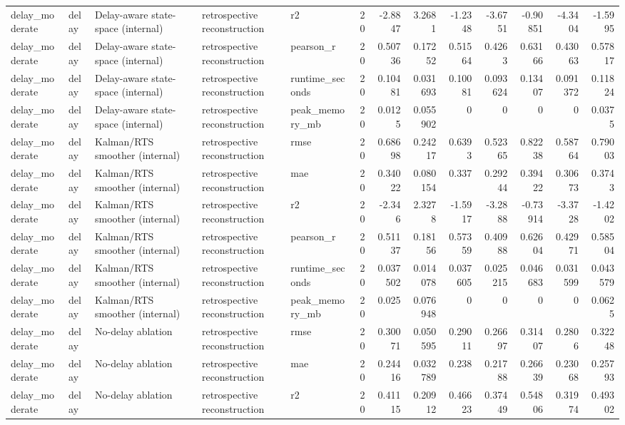 \begin{table}[!htbp]
{{\begin{tabular}{lllllrrrrrrrr}
delay_moderate & delay & Delay-aware state-space (internal) & retrospective reconstruction & r2 & 20 & -2.8847 & 3.2681 & -1.2348 & -3.6751 & -0.90851 & -4.3404 & -1.5995 \\
delay_moderate & delay & Delay-aware state-space (internal) & retrospective reconstruction & pearson_r & 20 & 0.50736 & 0.17252 & 0.51564 & 0.4263 & 0.63166 & 0.43063 & 0.57817 \\
delay_moderate & delay & Delay-aware state-space (internal) & retrospective reconstruction & runtime_seconds & 20 & 0.10481 & 0.031693 & 0.10081 & 0.093624 & 0.13407 & 0.091372 & 0.11824 \\
delay_moderate & delay & Delay-aware state-space (internal) & retrospective reconstruction & peak_memory_mb & 20 & 0.0125 & 0.055902 & 0 & 0 & 0 & 0 & 0.0375 \\
delay_moderate & delay & Kalman/RTS smoother (internal) & retrospective reconstruction & rmse & 20 & 0.68698 & 0.24217 & 0.6393 & 0.52365 & 0.82238 & 0.58764 & 0.79003 \\
delay_moderate & delay & Kalman/RTS smoother (internal) & retrospective reconstruction & mae & 20 & 0.34022 & 0.080154 & 0.337 & 0.29244 & 0.39422 & 0.30673 & 0.3743 \\
delay_moderate & delay & Kalman/RTS smoother (internal) & retrospective reconstruction & r2 & 20 & -2.346 & 2.3278 & -1.5917 & -3.2888 & -0.73914 & -3.3728 & -1.4202 \\
delay_moderate & delay & Kalman/RTS smoother (internal) & retrospective reconstruction & pearson_r & 20 & 0.51137 & 0.18156 & 0.57359 & 0.40988 & 0.62604 & 0.42971 & 0.58504 \\
delay_moderate & delay & Kalman/RTS smoother (internal) & retrospective reconstruction & runtime_seconds & 20 & 0.037502 & 0.014078 & 0.037605 & 0.025215 & 0.046683 & 0.031599 & 0.043579 \\
delay_moderate & delay & Kalman/RTS smoother (internal) & retrospective reconstruction & peak_memory_mb & 20 & 0.025 & 0.076948 & 0 & 0 & 0 & 0 & 0.0625 \\
delay_moderate & delay & No-delay ablation & retrospective reconstruction & rmse & 20 & 0.30071 & 0.050595 & 0.29011 & 0.26697 & 0.31407 & 0.2806 & 0.32248 \\
delay_moderate & delay & No-delay ablation & retrospective reconstruction & mae & 20 & 0.24416 & 0.032789 & 0.238 & 0.21788 & 0.26639 & 0.23068 & 0.25793 \\
delay_moderate & delay & No-delay ablation & retrospective reconstruction & r2 & 20 & 0.41115 & 0.20912 & 0.46623 & 0.37449 & 0.54806 & 0.31974 & 0.49302 \\

\end{tabular}}}
\end{table}
